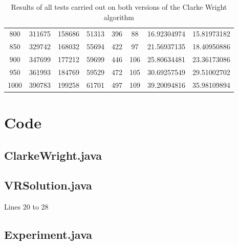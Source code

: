 \documentclass[conference]{acmsiggraph}
\begin{document}
\begin{table}[b]
{{\begin{minipage}{\textwidth}
\begin{tabular}{cccccccc}
    800                  & 311675             & 158686          & 51313         & 396               & 88              & 16.92304974               & 15.81973182             \\
    850                  & 329742             & 168032          & 55694         & 422               & 97              & 21.56937135               & 18.40950886             \\
    900                  & 347699             & 177212          & 59699         & 446               & 106             & 25.80634481               & 23.36173086             \\
    950                  & 361993             & 184769          & 59529         & 472               & 105             & 30.69257549               & 29.51002702             \\
    1000                 & 390783             & 199258          & 61701         & 497               & 109             & 39.20094816               & 35.98109894             \\\hline
    \end{tabular}
   
    
    \caption[Table caption text]{Results of all tests carried out on both versions of the Clarke Wright algorithm}
    \label{table:name}
    \end{minipage} }
}
\end{table}

\clearpage
\section{Code}
\subsection{ClarkeWright.java}


\vfill

\subsection{VRSolution.java}
Lines 20 to 28


\subsection{Experiment.java}

\end{document}
